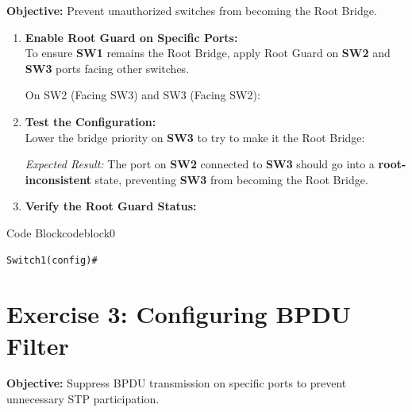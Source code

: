 \documentclass[a4paper]{book}
\begin{document}
\textbf{Objective:} Prevent unauthorized switches from becoming the Root Bridge.

\begin{enumerate} 
    \item \textbf{Enable Root Guard on Specific Ports:} \\
    To ensure \textbf{SW1} remains the Root Bridge, apply Root Guard on \textbf{SW2} and \textbf{SW3} ports facing other switches.

    On SW2 (Facing SW3) and SW3 (Facing SW2):


    \item \textbf{Test the Configuration:} \\
    Lower the bridge priority on \textbf{SW3} to try to make it the Root Bridge:


    \textit{Expected Result:} The port on \textbf{SW2} connected to \textbf{SW3} should go into a \textbf{root-inconsistent} state, preventing \textbf{SW3} from becoming the Root Bridge.

    \item \textbf{Verify the Root Guard Status:}

\end{enumerate}




\begin{ocg}{Code Block}{codeblock}{0}
\vspace{0.5cm}
\begin{lstlisting}
Switch1(config)# 
\end{lstlisting}
\end{ocg}


\section*{Exercise 3: Configuring BPDU Filter}

\textbf{Objective:} Suppress BPDU transmission on specific ports to prevent unnecessary STP participation.
\end{document}
